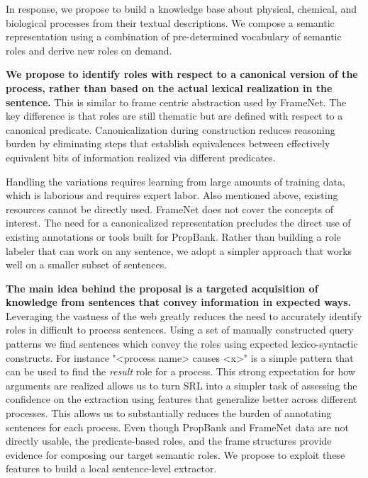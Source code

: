 In response, we propose to build a knowledge base about physical, chemical, and biological processes from their textual descriptions. 
We compose a semantic representation using a combination of pre-determined vocabulary of semantic roles and derive new roles on demand.

{\bf We propose to identify roles with respect to a canonical version of the process, rather than based on the actual lexical realization in the sentence.}
This is similar to frame centric abstraction used by FrameNet. The key difference is that roles are still thematic but are defined with respect to a canonical predicate.
Canonicalization during construction reduces reasoning burden by eliminating steps that establish equivalences 
between effectively equivalent bits of information realized via different predicates.

Handling the variations requires learning from large amounts of training data, which is laborious and requires expert labor.
Also mentioned above, existing resources cannot be directly used. FrameNet does not cover the concepts of interest. 
The need for a canonicalized representation precludes the direct use of existing annotations or tools built for PropBank.
Rather than building a role labeler that can work on any sentence, we adopt a simpler approach that works well on a smaller subset of sentences.

{\bf The main idea behind the proposal is a targeted acquisition of knowledge from sentences that convey information in expected ways.}
Leveraging the vastness of the web greatly reduces the need to accurately identify roles in difficult to process sentences.
Using a set of manually constructed query patterns we find sentences which convey the roles using expected lexico-syntactic constructs. 
For instance "<process name> causes <x>" is a simple pattern that can be used to find the {\em result} role for a process. 
This strong expectation for how arguments are realized allows us to turn SRL into a simpler task of assessing the confidence on the extraction using features that generalize better across different processes.  
This allows us to substantially reduces the burden of annotating sentences for each process.
Even though PropBank and FrameNet data are not directly usable, the predicate-based roles, and the frame structures provide evidence for composing our target semantic roles. 
We propose to exploit these features to build a local sentence-level extractor.

